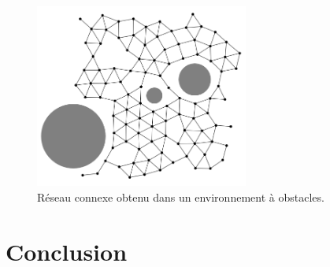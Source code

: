 \documentclass[10pt]{article}
\begin{document}
\begin{multicols}{2}
\begin{figure}[H]
  \centering

  \includegraphics[width=7cm]{obstacles.png}

  \caption{Réseau connexe obtenu dans un environnement à obstacles.}
  \label{obstacles}

\end{figure}

\section*{Conclusion}

\end{multicols}

\begin{figure}[p]

  \centering

  \subfloat[]{}\\
  \subfloat[]{}\\
  \subfloat[]{}

  \label{connexite}

\end{figure}

\begin{figure}[p]

  \centering

  \subfloat[]{}\\
  \subfloat[]{}\\
  \subfloat[]{}

  \label{connexite}

\end{figure}

\begin{figure}[p]

  \centering

  \subfloat[]{}\\
  \subfloat[]{}

  \label{connexite}

\end{figure}
\end{document}
